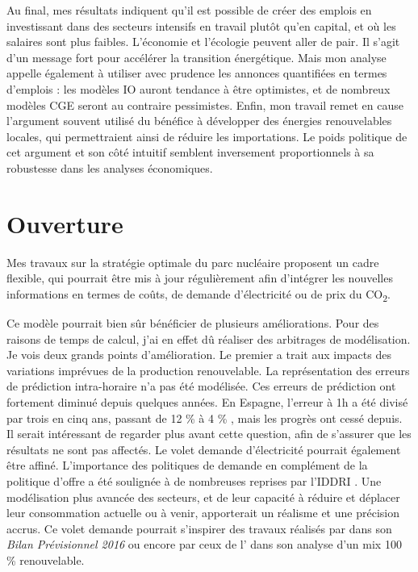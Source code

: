 Au final, mes résultats indiquent qu’il est possible de créer des emplois en investissant dans des secteurs intensifs en travail plutôt qu’en capital, et où les salaires sont plus faibles. L'économie et l'écologie peuvent aller de pair. Il s’agit d’un message fort pour accélérer la transition énergétique.
Mais mon analyse appelle également à utiliser avec prudence les annonces quantifiées en termes d’emplois : les modèles IO auront tendance à être optimistes, et de nombreux modèles CGE seront au contraire pessimistes.
Enfin, mon travail remet en cause l’argument souvent utilisé du bénéfice à développer des énergies renouvelables locales, qui permettraient ainsi de réduire les importations. Le poids politique de cet argument et son côté intuitif semblent inversement proportionnels à sa robustesse dans les analyses économiques.


\section{Ouverture}

Mes travaux sur la stratégie optimale du parc nucléaire proposent un cadre flexible, qui pourrait être mis à jour régulièrement afin d’intégrer les nouvelles informations en termes de coûts, de demande d’électricité ou de prix du CO\textsubscript{2}. 

Ce modèle pourrait bien sûr bénéficier de plusieurs améliorations. Pour des raisons de temps de calcul, j’ai en effet dû réaliser des arbitrages de modélisation. Je vois deux grands points d’amélioration. Le premier a trait aux impacts des variations imprévues de la production renouvelable. La représentation des erreurs de prédiction intra-horaire n’a pas été modélisée. Ces erreurs de prédiction ont fortement diminué depuis quelques années. En Espagne, l’erreur à 1h a été divisé par trois en cinq ans, passant de 12 \% à 4 \% \citep{IRENA2017}, mais les progrès ont cessé depuis. Il serait intéressant de regarder plus avant cette question, afin de s’assurer que les résultats ne sont pas affectés. Le volet demande d’électricité pourrait également être affiné. L’importance des politiques de demande en complément de la politique d’offre a été soulignée à de nombreuses reprises par l’IDDRI \citep{Berghmans2017}. Une modélisation plus avancée des secteurs, et de leur capacité à réduire et déplacer leur consommation actuelle ou à venir, apporterait un réalisme et une précision accrus. Ce volet demande pourrait s'inspirer des travaux réalisés par \citet{RTE2016} dans son \textit{Bilan Prévisionnel 2016} ou encore par ceux de l'\citet{ADEME2015} dans son analyse d'un mix 100 \% renouvelable.

